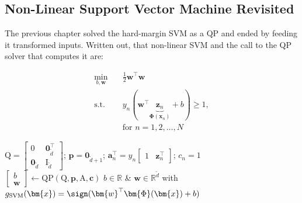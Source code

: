 
\subsection{Non-Linear Support Vector Machine Revisited}

The previous chapter solved the hard-margin SVM as a QP and ended by feeding
it transformed inputs. Written out, that non-linear SVM and the call to the
QP solver that computes it are:

\begin{center}
    \begin{minipage}[c]{0.4\textwidth}
        \[
            \begin{aligned}
                \min_{b, \bm{w}} \quad & \frac{1}{2} \bm{w}^\top \bm{w}\\
                \text{s.t.} \quad & y_n (\bm{w}^\top
                    \underbrace{\bm{z}_n}_{\bm{\Phi}(\bm{x}_n)} + b) \ge 1,\\
                & \text{for } n = 1, 2, \dots , N
            \end{aligned}
        \]
    \end{minipage}%
    \hfill
    \begin{minipage}[c]{0.56\textwidth}
        \begin{algorithm}[H]
            \caption{Non-Linear Hard-Margin SVM}\label{alg:nonlinear-hard-svm}
            \(\mathrm{Q} = \begin{bmatrix} 0 & \bm{0}_{\tilde{d}}^\top \\
                \bm{0}_{\tilde{d}} & \mathrm{I}_{\tilde{d}} \end{bmatrix}\);
                \(\bm{p} = \bm{0}_{\tilde{d}+1}\);
                \(\bm{a}_n^\top = y_n \begin{bmatrix} 1 & \bm{z}_n^\top
                \end{bmatrix}\); \(c_n = 1\)\;
            \(\begin{bmatrix} b \\ \bm{w} \end{bmatrix} \gets
                \mathrm{QP}(\mathrm{Q}, \bm{p}, \mathrm{A}, \bm{c})\)\;
            \Return \(b \in \mathbb{R}\) \& \(\bm{w} \in
                \mathbb{R}^{\tilde{d}}\) with \(g_{\mathrm{SVM}}(\bm{x}) =
                \sign(\bm{w}^\top \bm{\Phi}(\bm{x}) + b)\)\;
        \end{algorithm}
    \end{minipage}
\end{center}


